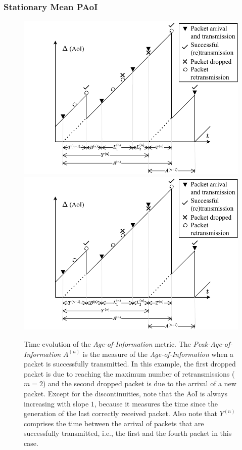 \subsubsection{Stationary Mean PAoI}
%
\begin{figure}[htb]
    \centering
    \if{}
        \includegraphics[width=0.7\columnwidth]{Figures/Ch6_PacketRetransmission_PAoI.pdf}
    \else
        \includegraphics[draft,width=0.85\columnwidth]{Figures/Ch6_PacketRetransmission_PAoI.pdf}
    \fi
    \caption{Time evolution of the \textit{Age-of-Information} metric. The \textit{Peak-Age-of-Information} $A^{(n)}$ is the measure of the \textit{Age-of-Information} when a packet is successfully transmitted. In this example, the first dropped packet is due to reaching the maximum number of retransmissions ($m=2$) and the second dropped packet is due to the arrival of a new packet.
    Except for the discontinuities, note that the AoI is always increasing with slope $1$, because it measures the time since the generation of the last correctly received packet.
    Also note that $Y^{(n)}$ comprises the time between the arrival of packets that are successfully transmitted, i.e., the first and the fourth packet in this case.
    }
    \label{fig:PAoI_diagram}
\end{figure}

